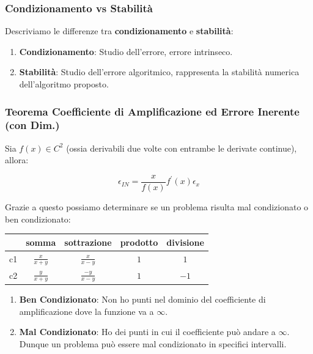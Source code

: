 \documentclass{article}
\begin{document}
\subsubsection{Condizionamento vs Stabilità}

Descriviamo le differenze tra \textbf{condizionamento} e \textbf{stabilità}:

\begin{enumerate}
    \item \textbf{Condizionamento}: Studio dell'errore, errore intrinseco.
    \item \textbf{Stabilità}: Studio dell'errore algoritmico, rappresenta la stabilità
    \newline
    numerica dell'algoritmo proposto.
\end{enumerate}

\subsubsection{Teorema Coefficiente di Amplificazione ed Errore Inerente (con Dim.)}

Sia $f(x) \in C^{2}$ (ossia derivabili due volte con entrambe le derivate continue), allora:

\[ \boxed{\epsilon_{IN} = \frac{x}{f(x)}f^{'}(x)\epsilon_{x}} \]

Grazie a questo possiamo determinare se un problema risulta mal condizionato o ben condizionato:

\begin{center}
    \begin{tabular}{ c | c | c | c | c }
    & somma & sottrazione & prodotto & divisione \\
    \hline
    c1 & $\frac{x}{x+y}$ & $\frac{x}{x-y}$ & $1$ & $1$ \\
    \hline
    c2 & $\frac{y}{x+y}$ & $\frac{-y}{x-y}$ & $1$ & $-1$ \\
    \hline
    \end{tabular}
\end{center}

\vspace*{5px}

\begin{enumerate}
    \item \textbf{Ben Condizionato}: Non ho punti nel dominio del coefficiente di amplificazione dove la funzione va a $\infty$.
    \item \textbf{Mal Condizionato}: Ho dei punti in cui il coefficiente può andare a $\infty$. Dunque un problema può essere mal condizionato in specifici intervalli.
\end{enumerate}
\end{document}
